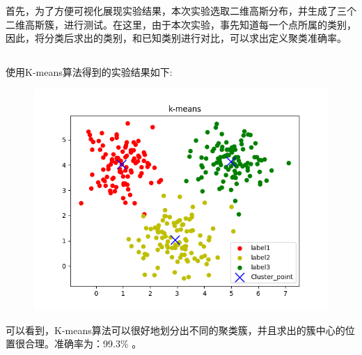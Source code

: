 \documentclass[lang=cn,a4paper,cite=authoryear]{elegantpaper}
\begin{document}
\section*{}
\subsection*{}
首先，为了方便可视化展现实验结果，本次实验选取二维高斯分布，并生成了三个二维高斯簇，进行测试。在这里，由于本次实验，事先知道每一个点所属的类别，因此，将分类后求出的类别，和已知类别进行对比，可以求出定义聚类准确率。

\subsection*{}
使用K-means算法得到的实验结果如下:
\begin{center}
	\begin{figure}[H]
		\centering
		\includegraphics[scale=0.6]{figure_1}
	\end{figure}
\end{center}
可以看到，K-means算法可以很好地划分出不同的聚类簇，并且求出的簇中心的位置很合理。准确率为：99.3\% 。
\end{document}
